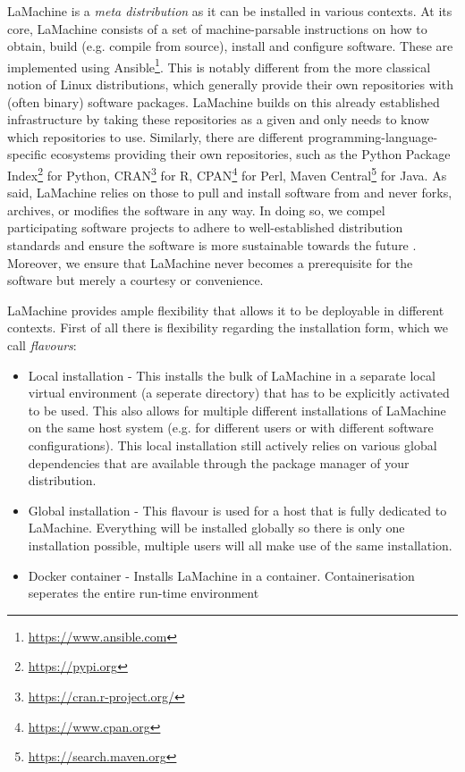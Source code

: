 \documentclass[a4paper,11pt]{article}
\begin{document}
LaMachine is a \emph{meta distribution} as it can be installed in various contexts. At its core, LaMachine consists of a
set of machine-parsable instructions on how to obtain, build (e.g. compile from source), install and configure software.
These are implemented using Ansible\footnote{\url{https://www.ansible.com}}.  This is notably different from the more
classical notion of Linux distributions, which generally provide their own repositories with (often binary) software
packages. LaMachine builds on this already established infrastructure by taking these repositories as a given and only
needs to know which repositories to use.  Similarly, there are different programming-language-specific ecosystems
providing their own repositories, such as the Python Package Index\footnote{\url{https://pypi.org}} for Python, CRAN\footnote{\url{https://cran.r-project.org/}} for R, CPAN\footnote{\url{https://www.cpan.org}} for Perl, Maven Central\footnote{\url{https://search.maven.org}} for Java.  As said, LaMachine relies on those to pull and install software from and never forks, archives, or modifies the software in any way. In doing so, we compel participating software projects to adhere to well-established distribution standards and ensure the software is more sustainable towards the future \cite{softwarequality}. Moreover, we ensure that LaMachine never becomes a prerequisite for the software but merely a courtesy or convenience.

LaMachine provides ample flexibility that allows it to be deployable in different contexts. First of all there is
flexibility regarding the installation form, which we call \emph{flavours}:

\begin{itemize}
    \item Local installation - This installs the bulk of LaMachine in a separate local virtual environment (a seperate
        directory) that has to be explicitly activated to be used. This also allows for multiple different installations
        of LaMachine on the same host system (e.g. for different users or with different software configurations).
        This local installation still actively relies on various global dependencies that are available through the
        package manager of your distribution.
    \item Global installation - This flavour is used for a host that is fully dedicated to LaMachine. Everything will be
        installed globally so there is only one installation possible, multiple users will all make use of the same
        installation.
    \item Docker container - Installs LaMachine in a container. Containerisation seperates the entire run-time
        environment
\end{itemize}
\end{document}
